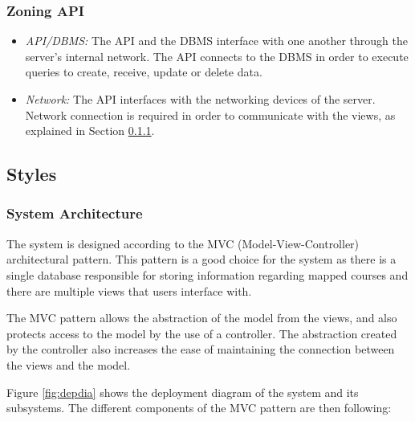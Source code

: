 \documentclass{article}
\begin{document}
    \subsubsection{Zoning API}

    \begin{itemize}
        \item \textit{API/DBMS:} The API and the DBMS interface with one
            another through the server's internal network. The API connects to
            the DBMS in order to execute queries to create, receive, update or
            delete data.
        \item \textit{Network:} The API interfaces with the networking devices
            of the server. Network connection is required in order to
            communicate with the views, as explained in Section
            \ref{sec:sysarch}.
    \end{itemize}

    \subsection{Styles}

    \subsubsection{System Architecture}
    \label{sec:sysarch}
    
    The system is designed according to the MVC (Model-View-Controller)
    architectural pattern. This pattern is a good choice for the system as
    there is a single database responsible for storing information regarding
    mapped courses and there are multiple views that users interface with.
    
    The MVC pattern allows the abstraction of the model from the views, and
    also protects access to the model by the use of a controller. The
    abstraction created by the controller also increases the ease of
    maintaining the connection between the views and the model.

    Figure \ref{fig:depdia} shows the deployment diagram of the system and its
    subsystems. The different components of the MVC pattern are then following:
\end{document}
